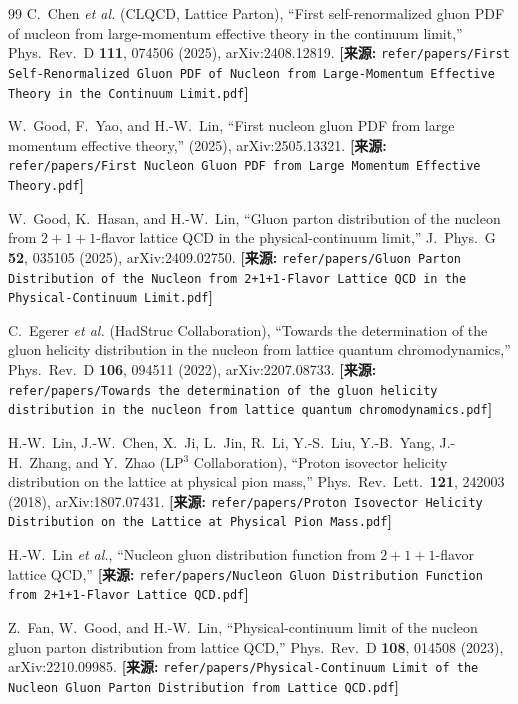 \documentclass[12pt,a4paper]{ctexart}
\theoremstyle{definition}
\begin{document}
\begin{thebibliography}{99}
C.~Chen \textit{et al.} (CLQCD, Lattice Parton),
``First self-renormalized gluon PDF of nucleon from large-momentum effective theory in the continuum limit,''
Phys.\ Rev.\ D \textbf{111}, 074506 (2025), arXiv:2408.12819.
\quad\textbf{[来源:} \texttt{refer/papers/First Self-Renormalized Gluon PDF of Nucleon from Large-Momentum Effective Theory in the Continuum Limit.pdf}\textbf{]}

W.~Good, F.~Yao, and H.-W.~Lin,
``First nucleon gluon PDF from large momentum effective theory,''
(2025), arXiv:2505.13321.
\quad\textbf{[来源:} \texttt{refer/papers/First Nucleon Gluon PDF from Large Momentum Effective Theory.pdf}\textbf{]}

W.~Good, K.~Hasan, and H.-W.~Lin,
``Gluon parton distribution of the nucleon from $2+1+1$-flavor lattice QCD in the physical-continuum limit,''
J.\ Phys.\ G \textbf{52}, 035105 (2025), arXiv:2409.02750.
\quad\textbf{[来源:} \texttt{refer/papers/Gluon Parton Distribution of the Nucleon from 2+1+1-Flavor Lattice QCD in the Physical-Continuum Limit.pdf}\textbf{]}


C.~Egerer \textit{et al.} (HadStruc Collaboration),
``Towards the determination of the gluon helicity distribution in the nucleon from lattice quantum chromodynamics,''
Phys.\ Rev.\ D \textbf{106}, 094511 (2022), arXiv:2207.08733.
\quad\textbf{[来源:} \texttt{refer/papers/Towards the determination of the gluon helicity distribution in the nucleon from lattice quantum chromodynamics.pdf}\textbf{]}


H.-W.~Lin, J.-W.~Chen, X.~Ji, L.~Jin, R.~Li, Y.-S.~Liu, Y.-B.~Yang, J.-H.~Zhang, and Y.~Zhao (LP$^3$ Collaboration),
``Proton isovector helicity distribution on the lattice at physical pion mass,''
Phys.\ Rev.\ Lett.\ \textbf{121}, 242003 (2018), arXiv:1807.07431.
\quad\textbf{[来源:} \texttt{refer/papers/Proton Isovector Helicity Distribution on the Lattice at Physical Pion Mass.pdf}\textbf{]}

H.-W.~Lin \textit{et al.},
``Nucleon gluon distribution function from $2+1+1$-flavor lattice QCD,''
\quad\textbf{[来源:} \texttt{refer/papers/Nucleon Gluon Distribution Function from 2+1+1-Flavor Lattice QCD.pdf}\textbf{]}

Z.~Fan, W.~Good, and H.-W.~Lin,
``Physical-continuum limit of the nucleon gluon parton distribution from lattice QCD,''
Phys.\ Rev.\ D \textbf{108}, 014508 (2023), arXiv:2210.09985.
\quad\textbf{[来源:} \texttt{refer/papers/Physical-Continuum Limit of the Nucleon Gluon Parton Distribution from Lattice QCD.pdf}\textbf{]}


\end{thebibliography}
\end{document}
